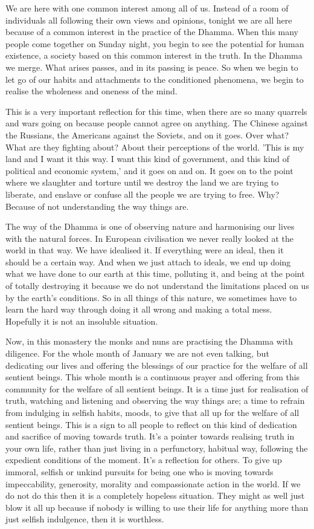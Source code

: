 
We are here with one common interest among all of us. Instead of a room of individuals all following their own views and opinions, tonight we are all here because of a common interest in the practice of the Dhamma. When this many people come together on Sunday night, you begin to see the potential for human existence, a society based on this common interest in the truth. In the Dhamma we merge. What arises passes, and in its passing is peace. So when we begin to let go of our habits and attachments to the conditioned phenomena, we begin to realise the wholeness and oneness of the mind.

This is a very important reflection for this time, when there are so many quarrels and wars going on because people cannot agree on anything. The Chinese against the Russians, the Americans against the Soviets, and on it goes. Over what? What are they fighting about? About their perceptions of the world. 'This is my land and I want it this way. I want this kind of government, and this kind of political and economic system,' and it goes on and on. It goes on to the point where we slaughter and torture until we destroy the land we are trying to liberate, and enslave or confuse all the people we are trying to free. Why? Because of not understanding the way things are.

The way of the Dhamma is one of observing nature and harmonising our lives with the natural forces. In European civilisation we never really looked at the world in that way. We have idealised it. If everything were an ideal, then it should be a certain way. And when we just attach to ideals, we end up doing what we have done to our earth at this time, polluting it, and being at the point of totally destroying it because we do not understand the limitations placed on us by the earth's conditions. So in all things of this nature, we sometimes have to learn the hard way through doing it all wrong and making a total mess. Hopefully it is not an insoluble situation.

Now, in this monastery the monks and nuns are practising the Dhamma with diligence. For the whole month of January we are not even talking, but dedicating our lives and offering the blessings of our practice for the welfare of all sentient beings. This whole month is a continuous prayer and offering from this community for the welfare of all sentient beings. It is a time just for realisation of truth, watching and listening and observing the way things are; a time to refrain from indulging in selfish habits, moods, to give that all up for the welfare of all sentient beings. This is a sign to all people to reflect on this kind of dedication and sacrifice of moving towards truth. It's a pointer towards realising truth in your own life, rather than just living in a perfunctory, habitual way, following the expedient conditions of the moment. It's a reflection for others. To give up immoral, selfish or unkind pursuits for being one who is moving towards impeccability, generosity, morality and compassionate action in the world. If we do not do this then it is a completely hopeless situation. They might as well just blow it all up because if nobody is willing to use their life for anything more than just selfish indulgence, then it is worthless.

